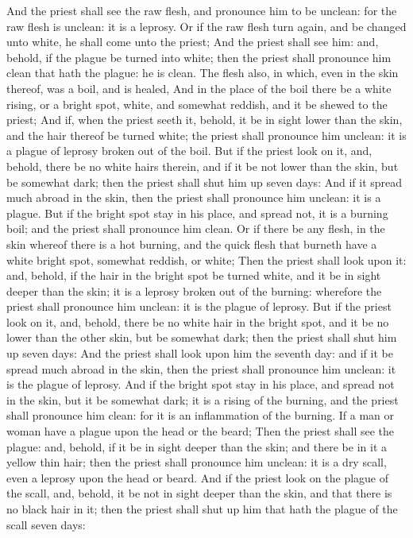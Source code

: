 \begin{biblechapter}
\verse And the priest shall see the raw flesh, and pronounce him to be unclean: for the raw flesh is unclean: it is a leprosy.
\verse Or if the raw flesh turn again, and be changed unto white, he shall come unto the priest;
\verse And the priest shall see him: and, behold, if the plague be turned into white; then the priest shall pronounce him clean that hath the plague: he is clean.
\verse The flesh also, in which, even in the skin thereof, was a boil, and is healed,
\verse And in the place of the boil there be a white rising, or a bright spot, white, and somewhat reddish, and it be shewed to the priest;
\verse And if, when the priest seeth it, behold, it be in sight lower than the skin, and the hair thereof be turned white; the priest shall pronounce him unclean: it is a plague of leprosy broken out of the boil.
\verse But if the priest look on it, and, behold, there be no white hairs therein, and if it be not lower than the skin, but be somewhat dark; then the priest shall shut him up seven days:
\verse And if it spread much abroad in the skin, then the priest shall pronounce him unclean: it is a plague.
\verse But if the bright spot stay in his place, and spread not, it is a burning boil; and the priest shall pronounce him clean.
\verse Or if there be any flesh, in the skin whereof there is a hot burning, and the quick flesh that burneth have a white bright spot, somewhat reddish, or white;
\verse Then the priest shall look upon it: and, behold, if the hair in the bright spot be turned white, and it be in sight deeper than the skin; it is a leprosy broken out of the burning: wherefore the priest shall pronounce him unclean: it is the plague of leprosy.
\verse But if the priest look on it, and, behold, there be no white hair in the bright spot, and it be no lower than the other skin, but be somewhat dark; then the priest shall shut him up seven days:
\verse And the priest shall look upon him the seventh day: and if it be spread much abroad in the skin, then the priest shall pronounce him unclean: it is the plague of leprosy.
\verse And if the bright spot stay in his place, and spread not in the skin, but it be somewhat dark; it is a rising of the burning, and the priest shall pronounce him clean: for it is an inflammation of the burning.
\verse If a man or woman have a plague upon the head or the beard;
\verse Then the priest shall see the plague: and, behold, if it be in sight deeper than the skin; and there be in it a yellow thin hair; then the priest shall pronounce him unclean: it is a dry scall, even a leprosy upon the head or beard.
\verse And if the priest look on the plague of the scall, and, behold, it be not in sight deeper than the skin, and that there is no black hair in it; then the priest shall shut up him that hath the plague of the scall seven days:

\end{biblechapter}
